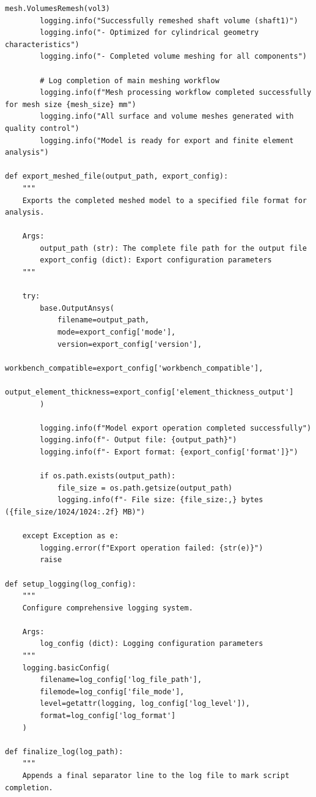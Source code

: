 \documentclass{book}
\begin{document}
\begin{itemize}[leftmargin=*,label=\textbullet]
\begin{itemize}
\begin{lstlisting}[caption={Phase 1 Meshing Automation Script},label={lst:phase1}]
        mesh.VolumesRemesh(vol3)
        logging.info("Successfully remeshed shaft volume (shaft1)")
        logging.info("- Optimized for cylindrical geometry characteristics")
        logging.info("- Completed volume meshing for all components")
        
        # Log completion of main meshing workflow
        logging.info(f"Mesh processing workflow completed successfully for mesh size {mesh_size} mm")
        logging.info("All surface and volume meshes generated with quality control")
        logging.info("Model is ready for export and finite element analysis")

def export_meshed_file(output_path, export_config):
    """
    Exports the completed meshed model to a specified file format for analysis.
    
    Args:
        output_path (str): The complete file path for the output file
        export_config (dict): Export configuration parameters
    """
    
    try:
        base.OutputAnsys(
            filename=output_path,
            mode=export_config['mode'],
            version=export_config['version'], 
            workbench_compatible=export_config['workbench_compatible'], 
            output_element_thickness=export_config['element_thickness_output']
        )
        
        logging.info(f"Model export operation completed successfully")
        logging.info(f"- Output file: {output_path}")
        logging.info(f"- Export format: {export_config['format']}")
        
        if os.path.exists(output_path):
            file_size = os.path.getsize(output_path)
            logging.info(f"- File size: {file_size:,} bytes ({file_size/1024/1024:.2f} MB)")
        
    except Exception as e:
        logging.error(f"Export operation failed: {str(e)}")
        raise

def setup_logging(log_config):
    """
    Configure comprehensive logging system.
    
    Args:
        log_config (dict): Logging configuration parameters
    """
    logging.basicConfig(
        filename=log_config['log_file_path'],
        filemode=log_config['file_mode'],
        level=getattr(logging, log_config['log_level']),
        format=log_config['log_format']
    )

def finalize_log(log_path):
    """
    Appends a final separator line to the log file to mark script completion.
    

\end{lstlisting}
\end{itemize}
\end{itemize}
\end{document}
